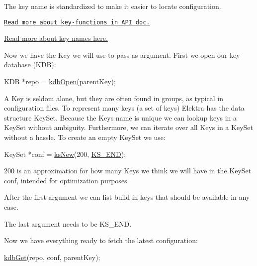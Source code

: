 The key name is standardized to make it easier to locate configuration.


\begin{DoxyItemize}
\item \href{https://doc.libelektra.org/api/current/html/group__key.html}{\tt Read more about key-\/functions in A\+PI doc.}
\item \hyperlink{doc_help_elektra-key-names_md}{Read more about key names here.}
\end{DoxyItemize}

Now we have the {\ttfamily Key} we will use to pass as argument. First we open our key database (K\+DB)\+:


\begin{DoxyCode}
KDB *repo = \hyperlink{group__kdb_ga6808defe5870f328dd17910aacbdc6ca}{kdbOpen}(parentKey);
\end{DoxyCode}


A {\ttfamily Key} is seldom alone, but they are often found in groups, as typical in configuration files. To represent many keys (a set of keys) Elektra has the data structure {\ttfamily Key\+Set}. Because the {\ttfamily Key}\textquotesingle{}s name is unique we can lookup keys in a {\ttfamily Key\+Set} without ambiguity. Furthermore, we can iterate over all {\ttfamily Key}s in a {\ttfamily Key\+Set} without a hassle. To create an empty {\ttfamily Key\+Set} we use\+:


\begin{DoxyCode}
KeySet *conf = \hyperlink{group__keyset_ga671e1aaee3ae9dc13b4834a4ddbd2c3c}{ksNew}(200, \hyperlink{kdbenum_8c_a7a28fce3773b2c873c94ac80b8b4cd54}{KS\_END});
\end{DoxyCode}



\begin{DoxyItemize}
\item 200 is an approximation for how many {\ttfamily Key}s we think we will have in the {\ttfamily Key\+Set} {\ttfamily conf}, intended for optimization purposes.
\item After the first argument we can list build-\/in keys that should be available in any case.
\item The last argument needs to be {\ttfamily K\+S\+\_\+\+E\+ND}.
\end{DoxyItemize}

Now we have everything ready to fetch the latest configuration\+:


\begin{DoxyCode}
\hyperlink{group__kdb_ga28e385fd9cb7ccfe0b2f1ed2f62453a1}{kdbGet}(repo, conf, parentKey);
\end{DoxyCode}


